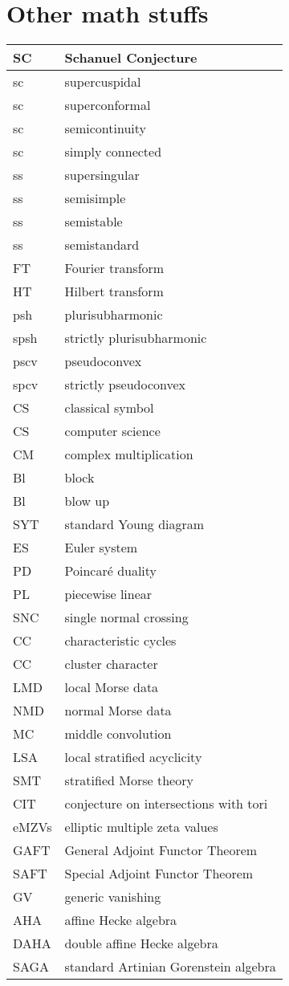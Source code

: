 \documentclass{amsart}
\numberwithin{equation}{section}
\theoremstyle{plain}
\numberwithin{equation}{section}
\theoremstyle{remark}
\begin{document}
\section{Other math stuffs}
\begin{longtable}{l|l}
\hline
SC & Schanuel Conjecture \\ \hline
sc & supercuspidal\\ \hline
sc & superconformal\\ \hline
sc & semicontinuity\\ \hline
sc & simply connected\\ \hline
ss & supersingular\\ \hline
ss & semisimple\\ \hline
ss & semistable\\ \hline
ss & semistandard\\ \hline
FT & Fourier transform\\ \hline
HT & Hilbert transform\\ \hline
psh & plurisubharmonic\\ \hline
spsh & strictly plurisubharmonic\\ \hline
pscv & pseudoconvex\\ \hline
spcv & strictly pseudoconvex\\ \hline 
CS & classical symbol\\ \hline
CS & computer science\\ \hline
CM & complex multiplication\\ \hline
Bl  & block\\ \hline
Bl  & blow up\\ \hline
SYT  & standard Young diagram\\ \hline
ES  & Euler system\\ \hline
PD & Poincaré duality\\ \hline
PL & piecewise linear\\ \hline
SNC & single normal crossing\\ \hline
CC & characteristic cycles\\ \hline
CC & cluster character\\ \hline
LMD & local Morse data\\ \hline
NMD & normal Morse data\\ \hline
MC & middle convolution\\ \hline
LSA & local stratified acyclicity\\ \hline
SMT & stratified Morse theory\\ \hline
CIT & conjecture on intersections with tori\\ \hline
eMZVs & elliptic multiple zeta values\\ \hline
GAFT & General Adjoint Functor Theorem\\ \hline
SAFT & Special Adjoint Functor Theorem\\ \hline
GV & generic vanishing\\ \hline
AHA & affine Hecke algebra\\ \hline
DAHA & double affine Hecke algebra\\ \hline
SAGA & standard Artinian Gorenstein algebra\\ \hline
\end{longtable}
\end{document}
